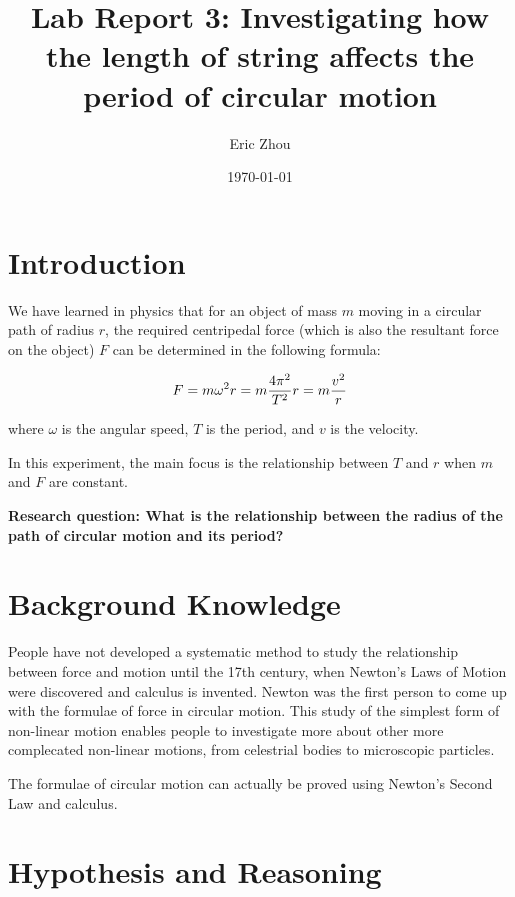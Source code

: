 \documentclass[a4paper]{article}
\begin{document}
\begin{titlepage}
    \title{\textbf{Lab Report 3: Investigating how the length of string affects the period of circular motion}}
    \author{Eric Zhou}
    \date{\today}
    \maketitle
\end{titlepage}

\section{Introduction}

We have learned in physics that for an object of mass $m$ moving in a circular path of radius $r$, the required centripedal force (which is also the resultant force on the object) $F$ can be determined in the following formula:

$$F = m \omega^2 r = m {4\pi^2 \over T^2} r = m {v^2 \over r}$$

where $\omega$ is the angular speed, $T$ is the period, and $v$ is the velocity.

In this experiment, the main focus is the relationship between $T$ and $r$ when $m$ and $F$ are constant.

\textbf{Research question: What is the relationship between the radius of the path of circular motion and its period?}

\section{Background Knowledge}

People have not developed a systematic method to study the relationship between force and motion until the 17th century, when Newton's Laws of Motion were discovered and calculus is invented. Newton was the first person to come up with the formulae of force in circular motion. This study of the simplest form of non-linear motion enables people to investigate more about other more complecated non-linear motions, from celestrial bodies to microscopic particles.

The formulae of circular motion can actually be proved using Newton's Second Law and calculus.

\section{Hypothesis and Reasoning}
\end{document}
